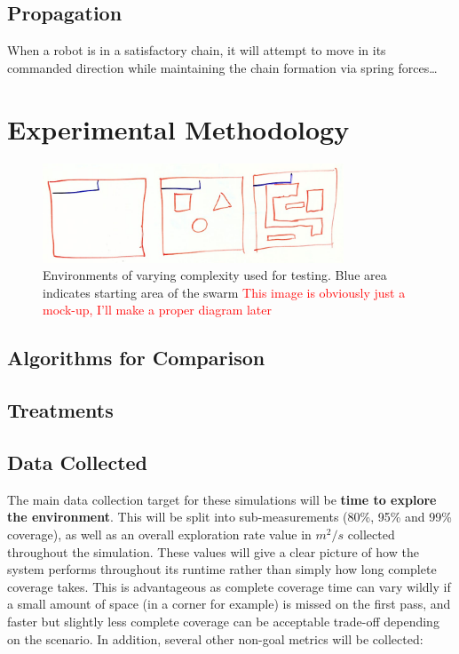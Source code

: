 \documentclass[runningheads]{llncs}
\newcommand\incomplete[1]{\textcolor{red}{#1}}
\begin{document}
\subsection{Propagation}
When a robot is in a satisfactory chain, it will attempt to move in its commanded direction while maintaining the chain formation via spring forces\dots


\pagebreak
\section{Experimental Methodology}
\begin{figure}[h]
    \centering
    \includegraphics[width=0.8\textwidth]{Images/Example Environments.jpg}
    \caption{Environments of varying complexity used for testing. Blue area indicates starting area of the swarm \incomplete{This image is obviously just a mock-up, I'll make a proper diagram later}}
    \label{fig:example environments}
    \end{figure}

\subsection{Algorithms for Comparison}



\subsection{Treatments}

\subsection{Data Collected}
The main data collection target for these simulations will be \textbf{time to explore the environment}. This will be split into sub-measurements (80\%, 95\% and 99\% coverage), as well as an overall exploration rate value in $m^2/s$ collected throughout the simulation. These values will give a clear picture of how the system performs throughout its runtime rather than simply how long complete coverage takes. This is advantageous as complete coverage time can vary wildly if a small amount of space (in a corner for example) is missed on the first pass, and faster but slightly less complete coverage can be acceptable trade-off depending on the scenario. In addition, several other non-goal metrics will be collected:
\end{document}
